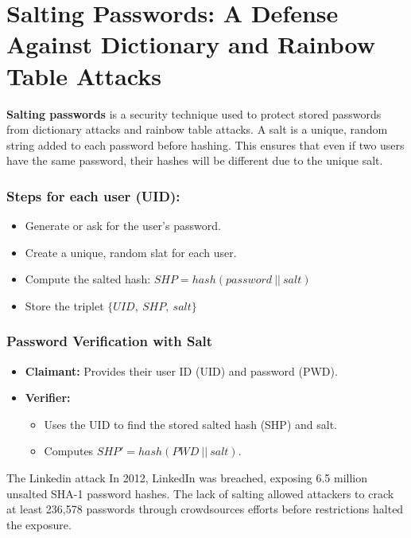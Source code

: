 \section{Salting Passwords: A Defense Against Dictionary and Rainbow Table Attacks}
\textbf{Salting passwords} is a security technique used to protect stored passwords from dictionary attacks and rainbow table attacks. A salt is a unique, random string added to each password before hashing. This ensures that even if two users have the same password, their hashes will be different due to the unique salt.
\newline
\newline
\begin{minipage}[t]{0.5\textwidth}
    \subsubsection{Steps for each user (UID):}
    \begin{itemize}
        \item Generate or ask for the user's password.
        \item Create a unique, random slat for each user.
        \item Compute the salted hash: \(SHP=hash(password\ ||\ salt)\)
        \item Store the triplet \(\{UID,\ SHP,\ salt\}\)
    \end{itemize}
\end{minipage} 
\hspace{0.5cm}
\begin{minipage}[t]{0.5\textwidth}
    \subsubsection{Password Verification with Salt}
   \begin{itemize}
    \item \textbf{Claimant:} Provides their user ID (UID) and password (PWD).
    \item \textbf{Verifier:} 
    \begin{itemize}
        \item Uses the UID to find the stored salted hash (SHP) and salt. 
        \item Computes \(SHP'=hash(PWD\ || \ salt)\).
    \end{itemize}
   \end{itemize}
\end{minipage}

\begin{quotebox-yellow}{The Linkedin attack}
    In 2012, LinkedIn was breached, exposing 6.5 million unsalted SHA-1 password hashes. The lack of salting allowed attackers to crack at least 236,578 passwords through crowdsources efforts before restrictions halted the exposure.
\end{quotebox-yellow}

